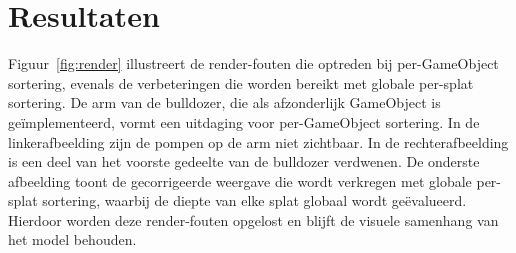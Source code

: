 \documentclass[twocolumn]{article}
\begin{document}
	\section{Resultaten}
Figuur~\ref{fig:render} illustreert de render-fouten die optreden bij per-GameObject sortering, evenals de verbeteringen die worden bereikt met globale per-splat sortering. De arm van de bulldozer, die als afzonderlijk GameObject is geïmplementeerd, vormt een uitdaging voor per-GameObject sortering. In de linkerafbeelding zijn de pompen op de arm niet zichtbaar. In de rechterafbeelding is een deel van het voorste gedeelte van de bulldozer verdwenen. De onderste afbeelding toont de gecorrigeerde weergave die wordt verkregen met globale per-splat sortering, waarbij de diepte van elke splat globaal wordt geëvalueerd. Hierdoor worden deze render-fouten opgelost en blijft de visuele samenhang van het model behouden.
\end{document}
